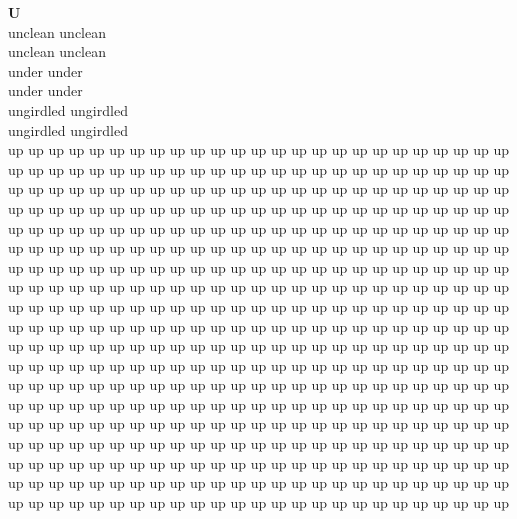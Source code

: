 \vspace{14pt}
\noindent\textbf{\Large U}\\[+12pt]
unclean unclean\\
unclean unclean\\
under under\\
under under\\
ungirdled ungirdled\\
ungirdled ungirdled\\
up up up up up up up up up up up up up up up up up up up up up up up up up\\
up up up up up up up up up up up up up up up up up up up up up up up up up\\
up up up up up up up up up up up up up up up up up up up up up up up up up\\
up up up up up up up up up up up up up up up up up up up up up up up up up\\
up up up up up up up up up up up up up up up up up up up up up up up up up\\
up up up up up up up up up up up up up up up up up up up up up up up up up\\
up up up up up up up up up up up up up up up up up up up up up up up up up\\
up up up up up up up up up up up up up up up up up up up up up up up up up\\
up up up up up up up up up up up up up up up up up up up up up up up up up\\
up up up up up up up up up up up up up up up up up up up up up up up up up\\
up up up up up up up up up up up up up up up up up up up up up up up up up\\
up up up up up up up up up up up up up up up up up up up up up up up up up\\
up up up up up up up up up up up up up up up up up up up up up up up up up\\
up up up up up up up up up up up up up up up up up up up up up up up up up\\
up up up up up up up up up up up up up up up up up up up up up up up up up\\
up up up up up up up up up up up up up up up up up up up up up up up up up\\
up up up up up up up up up up up up up up up up up up up up up up up up up\\
up up up up up up up up up up up up up up up up up up up up up up up up up\\
up up up up up up up up up up up up up up up up up up up up up up up up up\\
